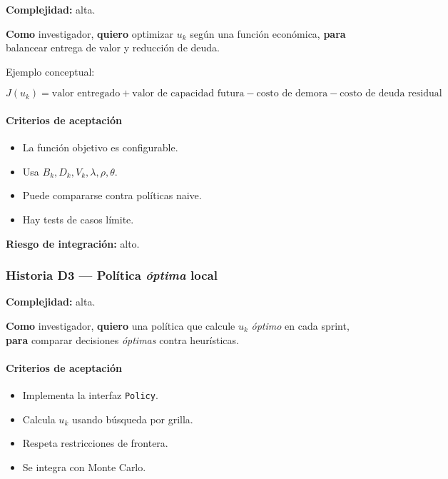 \documentclass[11pt,a4paper]{article}
\begin{document}
\textbf{Complejidad:} alta.

\textbf{Como} investigador, \textbf{quiero} optimizar $u_k$ seg\'un una funci\'on econ\'omica, \textbf{para} balancear entrega de valor y reducci\'on de deuda.

Ejemplo conceptual:

\begin{equation}
J(u_k)=
\text{valor entregado}
+
\text{valor de capacidad futura}
-
\text{costo de demora}
-
\text{costo de deuda residual}
\end{equation}

\paragraph{Criterios de aceptaci\'on}

\begin{itemize}[leftmargin=*]
    \item La funci\'on objetivo es configurable.
    \item Usa $B_k,D_k,V_k,\lambda,\rho,\theta$.
    \item Puede compararse contra pol\'iticas naive.
    \item Hay tests de casos l\'imite.
\end{itemize}

\textbf{Riesgo de integraci\'on:} alto.

\subsubsection{Historia D3 --- Pol\'itica \textit{\'optima} local}

\textbf{Complejidad:} alta.

\textbf{Como} investigador, \textbf{quiero} una pol\'itica que calcule $u_k$ \textit{\'optimo} en cada sprint, \textbf{para} comparar decisiones \textit{\'optimas} contra heur\'isticas.

\paragraph{Criterios de aceptaci\'on}

\begin{itemize}[leftmargin=*]
    \item Implementa la interfaz \texttt{Policy}.
    \item Calcula $u_k$ usando b\'usqueda por grilla.
    \item Respeta restricciones de frontera.
    \item Se integra con Monte Carlo.
\end{itemize}
\end{document}
